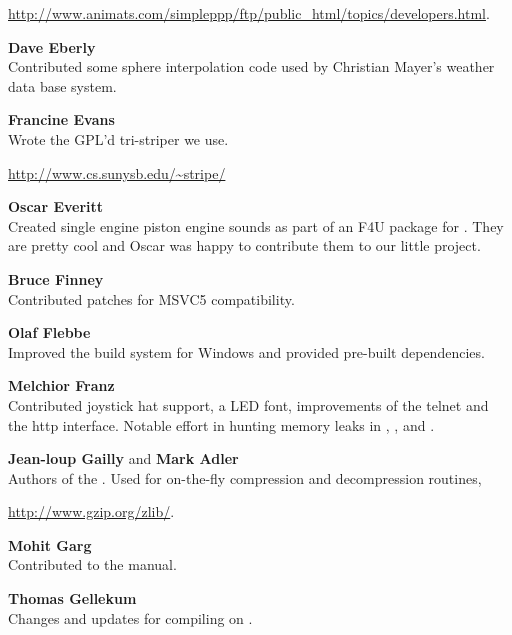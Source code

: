 \href{http://www.animats.com/simpleppp/ftp/public_html/topics/developers.html}{http://www.animats.com/simpleppp/ftp/public\_html/topics/developers.html}.
 \medskip

\noindent \textbf{Dave Eberly} \\
  Contributed some sphere interpolation code used by Christian Mayer's
  weather data base system.
  \medskip

\noindent \textbf{Francine Evans}\\
  Wrote the GPL'd tri-striper we use.
  \medskip

\href{http://www.cs.sunysb.edu/~stripe/}{http://www.cs.sunysb.edu/\~{}stripe/}
\medskip

\noindent \textbf{Oscar Everitt}\\
  Created single engine piston engine sounds as part of an F4U package
  for .  They are pretty cool and Oscar was happy to contribute
  them to our little project.
 \medskip

\noindent \textbf{Bruce Finney}\\
  Contributed patches for MSVC5 compatibility.
 \medskip

\noindent \textbf{Olaf Flebbe}\\
  Improved the build system for Windows and provided pre-built dependencies.
 \medskip

\noindent \textbf{Melchior Franz}\\
  Contributed joystick hat support, a LED font, improvements of the telnet and the http interface. Notable effort in hunting memory leaks in \FlightGear{}, \SimGear{}, and \JSBSim{}.
  \medskip

\noindent \textbf{Jean-loup Gailly} and \textbf{Mark Adler}\\
  Authors of the .  Used for on-the-fly compression and
  decompression routines,

  \href{http://www.gzip.org/zlib/}{http://www.gzip.org/zlib/}.
 \medskip

\noindent \textbf{Mohit Garg}\\
 Contributed to the manual.
 \medskip

\noindent \textbf{Thomas Gellekum}\\
  Changes and updates for compiling on .
 \medskip

